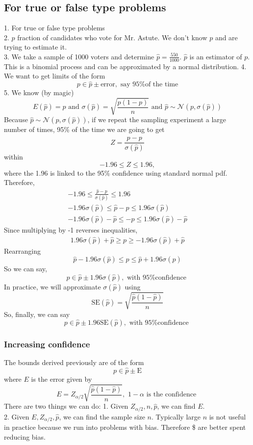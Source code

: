 \documentclass{article}
\newcommand{\beq}{\begin{equation}}
\newcommand{\eeq}{\end{equation}}
\newcommand{\ber}{\begin{eqnarray}}
\newcommand{\eer}{\end{eqnarray}}
\begin{document}
\subsection{For true or false type problems}
1. For true or false type problems\\
2. $p$ fraction of candidates who vote for Mr. Astute. We don't know $p$ and are trying to estimate it.\\
3. We take a sample of 1000 voters and determine $\hat{p}=\frac{550}{1000}$. $\hat{p}$ is an estimator of $p$. This is a binomial process and can be approximated by a normal distribution.
4. We want to get limits  of the form
\beq
p \in \hat{p} \pm \text{error} , \text{ say 95\% of the time}
\eeq
5. We know (by magic)
\beq
E(\hat{p}) = p \text{ and } \sigma(\hat{p}) = \sqrt{\frac{p(1-p)}{n}} \text{ and } \hat{p} \sim \mathcal{N}(p,\sigma(\hat{p}))
\eeq
Because $\hat{p} \sim \mathcal{N}(p,\sigma(\hat{p}))$, if we repeat the sampling experiment a large number of times, 95\% of the time we are going to get 
\beq
Z = \frac{\hat{p}-p}{\sigma(\hat{p})}
\eeq
within
\beq
-1.96 \le Z \le 1.96,
\eeq
where the 1.96 is linked to the 95\% confidence using standard normal pdf. Therefore,
\ber
-1.96 \le \frac{\hat{p}-p}{\sigma(\hat{p})} \le 1.96 \\
-1.96\sigma(\hat{p}) \le \hat{p}-p \le 1.96\sigma(\hat{p}) \\
-1.96\sigma(\hat{p}) - \hat{p}\le -p \le 1.96\sigma(\hat{p}) - \hat{p}
\eer
Since multiplying by -1 reverses inequalities,
\ber
1.96\sigma(\hat{p}) + \hat{p} \ge p \ge -1.96\sigma(\hat{p}) + \hat{p} 
\eer
Rearranging
\beq
\hat{p} -1.96\sigma(\hat{p}) \le p \le \hat{p} + 1.96\sigma(\hat{p})
\eeq
So we can say,
\beq
p \in \hat{p} \pm 1.96\sigma(\hat{p}), \text{ with 95\% confidence }
\eeq
In practice, we will approximate $\sigma(\hat{p})$ using
\beq
\text{SE}(\hat{p}) = \sqrt{\frac{\hat{p}(1-\hat{p})}{n}}
\eeq
So, finally, we can say
\beq
p \in \hat{p} \pm 1.96\text{SE}(\hat{p}), \text{ with 95\% confidence }
\eeq
\subsubsection{Increasing confidence}
The bounds derived previously are of the form
\beq
p \in \hat{p} \pm \text{E}
\eeq
where $E$ is the error given by
\beq
E = Z_{\alpha/2}\sqrt{\frac{\hat{p}(1-\hat{p})}{n}}, \,\, 1-\alpha \text{ is the confidence }
\eeq
There are two things we can do:
1. Given $Z_{\alpha/2},n,\hat{p}$, we can find $E$.\\
2. Given $E,Z_{\alpha/2},\hat{p}$, we can find the sample size $n$.
Typically large $n$ is not useful in practice because we run into problems with bias. Therefore \$ are better spent reducing bias.
\end{document}
